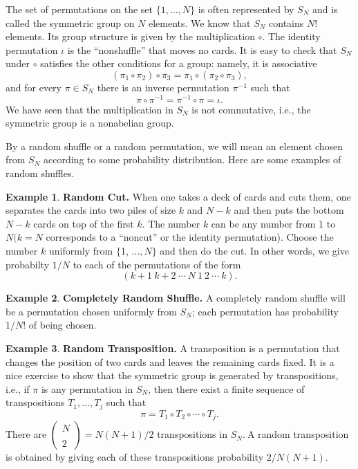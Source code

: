\documentclass{stml-l}
\theoremstyle{definition}
\newtheorem{example}{Example}
\numberwithin{equation}{chapter}
\numberwithin{figure}{chapter}
\numberwithin{figure}{section}
\begin{document}
The set of permutations on the set $\{1, \ldots , N\}$ is often represented by $S_{N}$ and is called the symmetric group on $N$ elements. We know that $S_{N}$ contains $N!$ elements. Its group structure is given by the multiplication $\circ$. The identity permutation $\iota$ is the ``nonshuffle'' that moves no cards. It is easy to check that $S_{N}$ under $\circ$ satisfies the other conditions for a group: namely, it is associative
\begin{equation*}
(\pi_{1}\circ\pi_{2})\circ\pi_{3}=\pi_{1}\circ(\pi_{2}\circ\pi_{3}),
\end{equation*}
and for every $\pi\in S_{N}$ there is an inverse permutation $\pi^{-1}$ such that
\begin{equation*}
\pi \circ\pi^{-1}=\pi^{-1}\circ\pi=\iota.
\end{equation*}
We have seen that the multiplication in $S_{N}$ is not commutative, i.e., the symmetric group is a nonabelian group.

By a random shuffle or a random permutation, we will mean an element chosen from $S_{N}$ according to some probability distribution. Here are some examples of random shuffles.

\begin{example}\label{ch05:exa1} \textbf{Random Cut.} When one takes a deck of cards and cuts them, one separates the cards into two piles of size $k$ and $N-k$ and then puts the bottom $N-k$ cards on top of the first $k$. The number $k$ can be any number from 1 to $N(k=N$ corresponds to a ``noncut'' or the identity permutation). Choose the number $k$ uniformly from $\{$1, $\ldots,N\}$ and then do the cut. In other words, we
give probabilty $1/N$ to each of the permutations of the form
\begin{equation*}
(k+1\ k+2\ \cdots\ N\ 1\ 2\ \cdots\ k).
\end{equation*}
\end{example}

\begin{example}\label{ch05:exa2} \textbf{Completely Random Shuffle.} A completely random shuffle will be a permutation chosen uniformly from $S_{N}$; each permutation has probability $1/N!$ of being chosen.
\end{example}

\begin{example}\label{ch05:exa3} \textbf{Random Transposition.} A transposition is a permutation that changes the position of two cards and leaves the remaining cards fixed. It is a nice exercise to show that the symmetric group is generated by transpositions, i.e., if $\pi$ is any permutation in $S_{N}$, then there exist a finite sequence of transpositions $T_{1},\ldots,T_{j}$ such that
\begin{equation*}
\pi=T_{1}\circ T_{2}\circ \cdots \circ T_{j}.
\end{equation*}
There are $\left(\substack{N\\\\2}\right)=N(N+1)/2$ transpositions in $S_{N}.\ \mathrm{A}$ random transposition is obtained by giving each of these transpositions probability $2/N(N+1)$.
\end{example}
\end{document}
